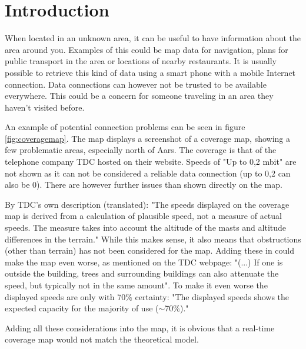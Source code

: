 \chapter{Introduction}
\label{chap:intro}

When located in an unknown area, it can be useful to have information about the area around you. Examples of this could be map data for navigation, plans for public transport in the area or locations of nearby restaurants. It is usually possible to retrieve this kind of data using a smart phone with a mobile Internet connection. Data connections can however not be trusted to be available everywhere. This could be a concern for someone traveling in an area they haven't visited before.

An example of potential connection problems can be seen in figure \ref{fig:coveragemap}.
The map displays a screenshot of a coverage map, showing a few problematic areas, especially north of Aars. The coverage is that of the telephone company TDC hosted on their website\cite{tdccoverage}. Speeds of "Up to 0,2 mbit" are not shown as it can not be considered a reliable data connection (up to 0,2 can also be 0). There are however further issues than shown directly on the map.

By TDC's own description (translated): "The speeds displayed on the coverage map is derived from a calculation of plausible speed, not a measure of actual speeds. The measure takes into account the altitude of the masts and altitude differences in the terrain."
While this makes sense, it also means that obstructions (other than terrain) has not been considered for the map. Adding these in could make the map even worse, as mentioned on the TDC webpage: "(...) If one is outside the building, trees and surrounding buildings can also attenuate the speed, but typically not in the same amount".
To make it even worse the displayed speeds are only with 70\% certainty: "The displayed speeds shows the expected capacity for the majority of use ($\sim$70\%)."

Adding all these considerations into the map, it is obvious that a real-time coverage map would not match the theoretical model. 

